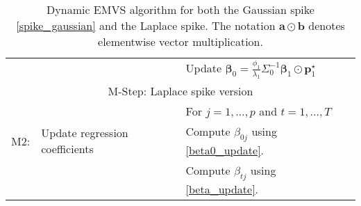 \documentclass[ba]{imsart}
\numberwithin{equation}{section}
\theoremstyle{plain}
\def\b{\mbox{\boldmath$b$}}
\newcommand{\bm}[1]{\boldsymbol{#1}}
\newcommand{\wt}[1]{\widetilde{#1}}
\def\b{\bm{\beta}}
\begin{document}
{{\begin{table}[!t]
\begin{center}
{\begin{tabular}{|lll|}
	&     & Update $\b_0 =\frac{\phi_1}{\lambda_1}\Sigma_0^{-1}\b_{1} \odot \bm p^\star_{1}  $\\
\multicolumn{3}{|c|}{\cellcolor[HTML]{C0C0C0}M-Step: Laplace spike version}                                                  \\
       &                                    & For $j=1,\dots, p$  and $t=1,\dots, T$                                             \\
M2: &  Update  regression coefficients  & Compute $\beta_{0j}$  using \eqref{beta0_update}. \\
       &                                    & Compute $\beta_{tj}$  using \eqref{beta_update}.                                                                \\
\hline\hline
\end{tabular}}
\end{center}
\caption{\small  Dynamic EMVS algorithm for both the Gaussian spike \eqref{spike_gaussian} and the Laplace spike. The notation $\bm a\odot \bm b$ denotes elementwise vector multiplication. %
}
\label{EM}
\end{table}



}}
\end{document}
